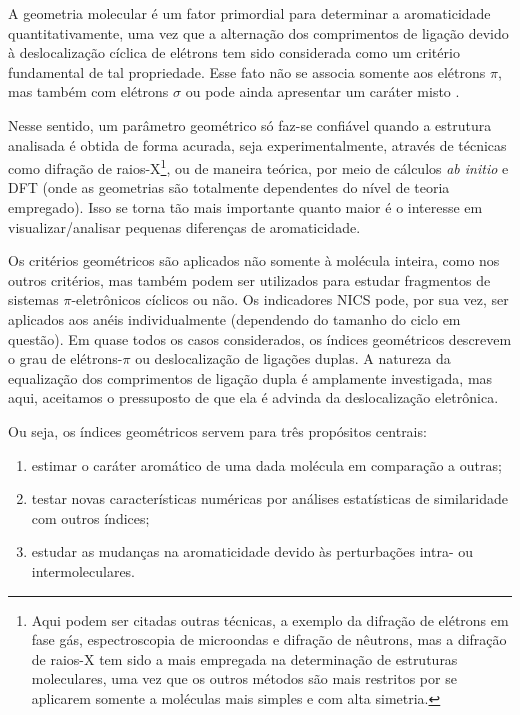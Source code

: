 A geometria molecular é um fator primordial para determinar a aromaticidade quantitativamente, uma vez que a alternação dos comprimentos de ligação devido à deslocalização cíclica de elétrons tem sido considerada como um critério fundamental de tal propriedade. Esse fato não se associa somente aos elétrons $\pi$, mas também com elétrons $\sigma$ ou pode ainda apresentar um caráter misto \autocite{Evans1938, Evans1938a, Evans1939}.

Nesse sentido, um parâmetro geométrico só faz-se confiável quando a estrutura analisada é obtida de forma acurada, seja experimentalmente, através de técnicas como difração de raios-X\footnote{Aqui podem ser citadas outras técnicas, a exemplo da difração de elétrons em fase gás, espectroscopia de microondas e difração de nêutrons, mas a difração de raios-X tem sido a mais empregada na determinação de estruturas moleculares, uma vez que os outros métodos são mais restritos por se aplicarem somente a moléculas mais simples e com alta simetria.}, ou de maneira teórica, por meio de cálculos \textit{ab initio} e \gls{DFT} (onde as geometrias são totalmente dependentes do nível de teoria empregado). Isso se torna tão mais importante quanto maior é o interesse em visualizar/analisar pequenas diferenças de aromaticidade.

Os critérios geométricos são aplicados não somente à molécula inteira, como nos outros critérios, mas também podem ser utilizados para estudar fragmentos de sistemas $\pi$-eletrônicos cíclicos ou não. Os indicadores \gls{NICS} pode, por sua vez, ser aplicados aos anéis individualmente (dependendo do tamanho do ciclo em questão). Em quase todos os casos considerados, os índices geométricos descrevem o grau de elétrons-$\pi$ ou deslocalização de ligações duplas. A natureza da equalização dos comprimentos de ligação dupla é amplamente investigada, mas aqui, aceitamos o pressuposto de que ela é advinda da deslocalização eletrônica.

Ou seja, os índices geométricos servem para três propósitos centrais:

\begin{enumerate}
    \item estimar o caráter aromático de uma dada molécula em comparação a outras;
    \item testar novas características numéricas por análises estatísticas de similaridade com outros índices;
    \item estudar as mudanças na aromaticidade devido às perturbações intra- ou intermoleculares.
\end{enumerate}

